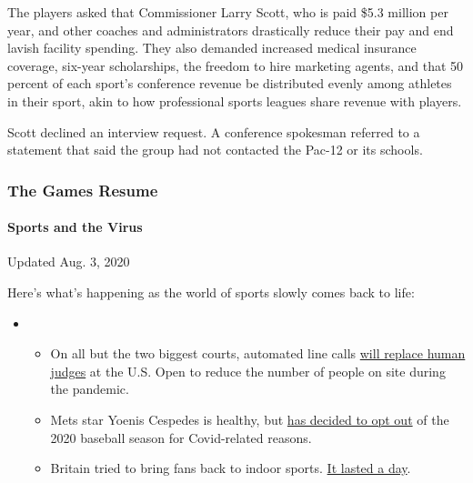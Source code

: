 The players asked that Commissioner Larry Scott, who is paid \$5.3
million per year, and other coaches and administrators drastically
reduce their pay and end lavish facility spending. They also demanded
increased medical insurance coverage, six-year scholarships, the freedom
to hire marketing agents, and that 50 percent of each sport's conference
revenue be distributed evenly among athletes in their sport, akin to how
professional sports leagues share revenue with players.

Scott declined an interview request. A conference spokesman referred to
a statement that said the group had not contacted the Pac-12 or its
schools.

\hypertarget{the-games-resume}{%
\subsubsection{The Games Resume}\label{the-games-resume}}

\hypertarget{sports-and-the-virus}{%
\paragraph{Sports and the Virus}\label{sports-and-the-virus}}

Updated Aug. 3, 2020

Here's what's happening as the world of sports slowly comes back to
life:

\begin{itemize}
\item
  \begin{itemize}
  \tightlist
  \item
    On all but the two biggest courts, automated line calls
    \href{https://www.nytimes.com/2020/08/03/sports/tennis/us-open-hawkeye-line-judges.html?action=click\&pgtype=Article\&state=default\&region=MAIN_CONTENT_2\&context=storylines_keepup}{will
    replace human judges} at the U.S. Open to reduce the number of
    people on site during the pandemic.
  \item
    Mets star Yoenis Cespedes is healthy, but
    \href{https://www.nytimes.com/2020/08/02/sports/baseball/Yoenis-cespedes-opt-out-rule.html?action=click\&pgtype=Article\&state=default\&region=MAIN_CONTENT_2\&context=storylines_keepup}{has
    decided to opt out} of the 2020 baseball season for Covid-related
    reasons.
  \item
    Britain tried to bring fans back to indoor sports.
    \href{https://www.nytimes.com/2020/08/02/sports/snooker-world-championship.html?action=click\&pgtype=Article\&state=default\&region=MAIN_CONTENT_2\&context=storylines_keepup}{It
    lasted a day}.
  \end{itemize}
\end{itemize}

